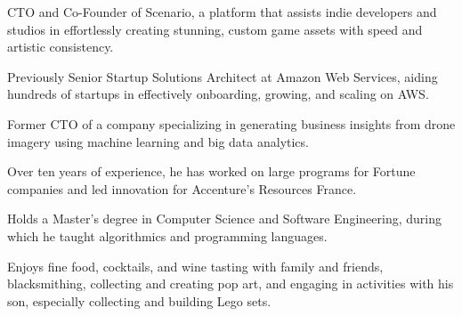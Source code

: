 
\begin{cvparagraph}

CTO and Co-Founder of Scenario, a platform that assists indie developers and studios in effortlessly creating stunning, custom game assets with speed and artistic consistency.

Previously Senior Startup Solutions Architect at Amazon Web Services, aiding hundreds of startups in effectively onboarding, growing, and scaling on AWS.

Former CTO of a company specializing in generating business insights from drone imagery using machine learning and big data analytics.

Over ten years of experience, he has worked on large programs for Fortune companies and led innovation for Accenture’s Resources France.

Holds a Master’s degree in Computer Science and Software Engineering, during which he taught algorithmics and programming languages.

Enjoys fine food, cocktails, and wine tasting with family and friends, blacksmithing, collecting and creating pop art, and engaging in activities with his son, especially collecting and building Lego sets.
\end{cvparagraph}

